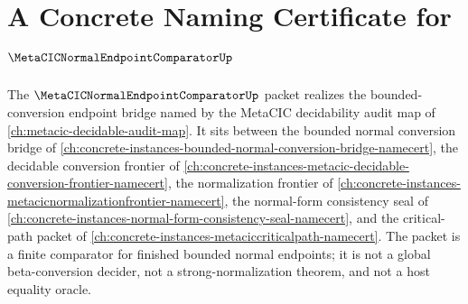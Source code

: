 \chapter{A Concrete Naming Certificate for $\MetaCICNormalEndpointComparatorUp$}
\label{ch:concrete-instances-metacic-normal-endpoint-comparator-namecert}

The $\MetaCICNormalEndpointComparatorUp$ packet realizes the bounded-conversion endpoint bridge named by the MetaCIC decidability audit map of \autoref{ch:metacic-decidable-audit-map}. It sits between the bounded normal conversion bridge of \autoref{ch:concrete-instances-bounded-normal-conversion-bridge-namecert}, the decidable conversion frontier of \autoref{ch:concrete-instances-metacic-decidable-conversion-frontier-namecert}, the normalization frontier of \autoref{ch:concrete-instances-metacicnormalizationfrontier-namecert}, the normal-form consistency seal of \autoref{ch:concrete-instances-normal-form-consistency-seal-namecert}, and the critical-path packet of \autoref{ch:concrete-instances-metaciccriticalpath-namecert}. The packet is a finite comparator for finished bounded normal endpoints; it is not a global beta-conversion decider, not a strong-normalization theorem, and not a host equality oracle.

